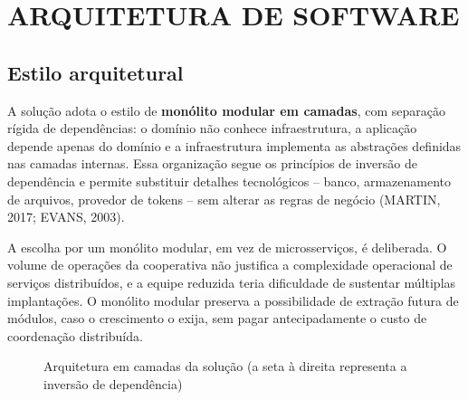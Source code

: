\section{ARQUITETURA DE SOFTWARE}

\subsection{Estilo arquitetural}

A solução adota o estilo de \textbf{monólito modular em camadas}, com separação
rígida de dependências: o domínio não conhece infraestrutura, a aplicação
depende apenas do domínio e a infraestrutura implementa as abstrações definidas
nas camadas internas. Essa organização segue os princípios de inversão de
dependência e permite substituir detalhes tecnológicos -- banco, armazenamento de
arquivos, provedor de tokens -- sem alterar as regras de negócio (MARTIN, 2017;
EVANS, 2003).

A escolha por um monólito modular, em vez de microsserviços, é deliberada. O
volume de operações da cooperativa não justifica a complexidade operacional de
serviços distribuídos, e a equipe reduzida teria dificuldade de sustentar
múltiplas implantações. O monólito modular preserva a possibilidade de extração
futura de módulos, caso o crescimento o exija, sem pagar antecipadamente o custo
de coordenação distribuída.

\begin{figure}[H]
  \centering
  \caption{Arquitetura em camadas da solução (a seta à direita representa a inversão de dependência)}
  \label{fig:camadas}
\end{figure}

